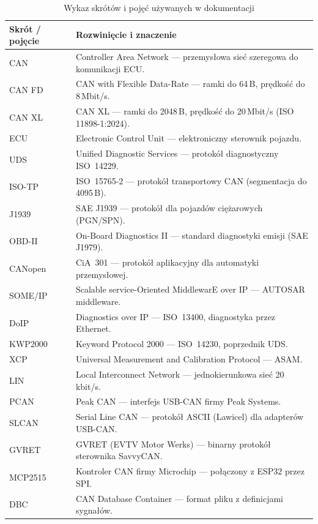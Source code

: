 \documentclass[12pt, a4paper]{article}
\begin{document}
\begin{table}[H]
\caption{Wykaz skrótów i pojęć używanych w dokumentacji}
\label{tab:abbreviations}
\centering
\small
\begin{tabular}{p{3.0cm}p{11.5cm}}
\toprule
\textbf{Skrót / pojęcie} & \textbf{Rozwinięcie i znaczenie} \\
\midrule
CAN      & Controller Area Network --- przemysłowa sieć szeregowa do komunikacji ECU. \\
CAN FD   & CAN with Flexible Data-Rate --- ramki do 64\,B, prędkość do 8\,Mbit/s. \\
CAN XL   & CAN XL --- ramki do 2048\,B, prędkość do 20\,Mbit/s (ISO 11898-1:2024). \\
ECU      & Electronic Control Unit --- elektroniczny sterownik pojazdu. \\
UDS      & Unified Diagnostic Services --- protokół diagnostyczny ISO~14229. \\
ISO-TP   & ISO~15765-2 --- protokół transportowy CAN (segmentacja do 4095\,B). \\
J1939    & SAE J1939 --- protokół dla pojazdów ciężarowych (PGN/SPN). \\
OBD-II   & On-Board Diagnostics II --- standard diagnostyki emisji (SAE J1979). \\
CANopen  & CiA~301 --- protokół aplikacyjny dla automatyki przemysłowej. \\
SOME/IP  & Scalable service-Oriented MiddlewarE over IP --- AUTOSAR middleware. \\
DoIP     & Diagnostics over IP --- ISO~13400, diagnostyka przez Ethernet. \\
KWP2000  & Keyword Protocol 2000 --- ISO~14230, poprzednik UDS. \\
XCP      & Universal Measurement and Calibration Protocol --- ASAM. \\
LIN      & Local Interconnect Network --- jednokierunkowa sieć 20\,kbit/s. \\
PCAN     & Peak CAN --- interfejs USB-CAN firmy Peak Systems. \\
SLCAN    & Serial Line CAN --- protokół ASCII (Lawicel) dla adapterów USB-CAN. \\
GVRET    & GVRET (EVTV Motor Werks) --- binarny protokół sterownika SavvyCAN. \\
MCP2515  & Kontroler CAN firmy Microchip --- połączony z ESP32 przez SPI. \\
DBC      & CAN Database Container --- format pliku z definicjami sygnałów. \\

\end{tabular}
\end{table}
\end{document}
